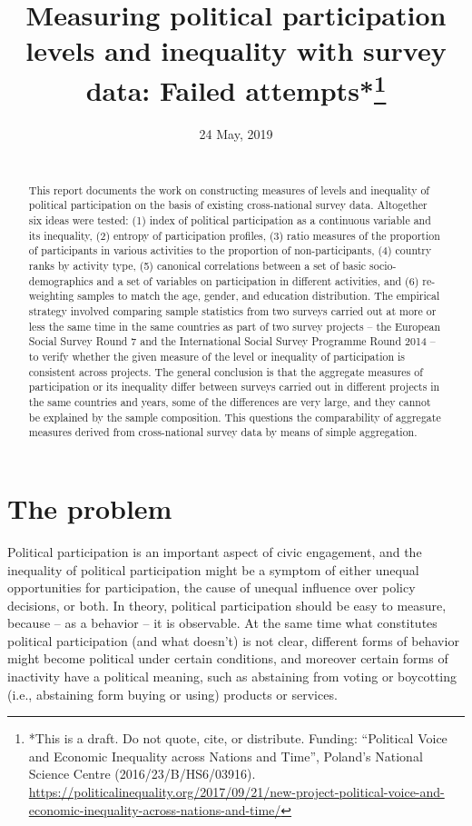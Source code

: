 \documentclass[12pt,]{article}
\title{\vspace{1cm}Measuring political participation levels and inequality with survey data: Failed attempts*\footnote{*This is a draft. Do not quote, cite, or distribute. Funding: ``Political Voice and Economic Inequality across Nations and Time'', Poland's National Science Centre (2016/23/B/HS6/03916). \url{https://politicalinequality.org/2017/09/21/new-project-political-voice-and-economic-inequality-across-nations-and-time/}}\vspace{0.5cm}\\}
\author{}
\date{24 May, 2019\\
~\\}
\begin{document}
\maketitle
\begin{abstract}
\noindent{}This report documents the work on constructing measures of levels and inequality of political participation on the basis of existing cross-national survey data. Altogether six ideas were tested: (1) index of political participation as a continuous variable and its inequality, (2) entropy of participation profiles, (3) ratio measures of the proportion of participants in various activities to the proportion of non-participants, (4) country ranks by activity type, (5) canonical correlations between a set of basic socio-demographics and a set of variables on participation in different activities, and (6) re-weighting samples to match the age, gender, and education distribution. The empirical strategy involved comparing sample statistics from two surveys carried out at more or less the same time in the same countries as part of two survey projects -- the European Social Survey Round 7 and the International Social Survey Programme Round 2014 -- to verify whether the given measure of the level or inequality of participation is consistent across projects. The general conclusion is that the aggregate measures of participation or its inequality differ between surveys carried out in different projects in the same countries and years, some of the differences are very large, and they cannot be explained by the sample composition. This questions the comparability of aggregate measures derived from cross-national survey data by means of simple aggregation. \vspace{.8cm}
\end{abstract}

\clearpage

\renewcommand{\baselinestretch}{0.5}\normalsize
\tableofcontents
\renewcommand{\baselinestretch}{1.1}\normalsize

\clearpage

\hypertarget{the-problem}{%
\section{The problem}\label{the-problem}}

Political participation is an important aspect of civic engagement, and the inequality of political participation might be a symptom of either unequal opportunities for participation, the cause of unequal influence over policy decisions, or both. In theory, political participation should be easy to measure, because -- as a behavior -- it is observable. At the same time what constitutes political participation (and what doesn't) is not clear, different forms of behavior might become political under certain conditions, and moreover certain forms of inactivity have a political meaning, such as abstaining from voting or boycotting (i.e., abstaining form buying or using) products or services.
\end{document}
